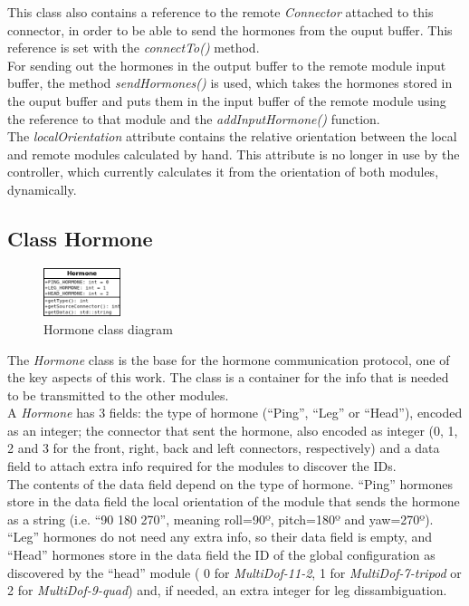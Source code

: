 This class also contains a reference to the remote \emph{Connector} attached to this connector, in order to be able to send the hormones from the ouput buffer. This reference is set with the \emph{connectTo()} method.\\

For sending out the hormones in the output buffer to the remote module input buffer, the method \emph{sendHormones()} is used, which takes the hormones stored in the ouput buffer and puts them in the input buffer of the remote module using the reference to that module and the \emph{addInputHormone()} function.\\

The \emph{localOrientation} attribute contains the relative orientation between the local and remote modules calculated by hand. This attribute is no longer in use by the controller, which currently calculates it from the orientation of both modules, dynamically.\\


\subsection{Class Hormone}
\label{software_class_hormone}

\begin{figure}[h]
		\centering
        \includegraphics[width=0.2\textwidth]{images/Class_diagram_Hormone_members.png}
        \caption{Hormone class diagram}\label{fig:software_class_hormone_class}
\end{figure}

The \emph{Hormone} class is the base for the hormone communication protocol, one of the key aspects of this work. The class is a container for the info that is needed to be transmitted to the other modules.\\

A \emph{Hormone} has 3 fields: the type of hormone (``Ping'', ``Leg'' or  ``Head''), encoded as an integer; the connector that sent the hormone, also encoded as integer (0, 1, 2 and 3 for the front, right, back and left connectors, respectively) and a data field to attach extra info required for the modules to discover the IDs.\\

The contents of the data field depend on the type of hormone. ``Ping'' hormones store in the data field the local orientation of the module that sends the hormone as a string (i.e. ``90 180 270'', meaning roll=90º, pitch=180º and yaw=270º). ``Leg'' hormones do not need any extra info, so their data field is empty, and ``Head'' hormones store in the data field the ID of the global configuration as discovered by the ``head'' module ( 0 for \emph{MultiDof-11-2}, 1 for \emph{MultiDof-7-tripod} or 2 for  \emph{MultiDof-9-quad}) and, if needed, an extra integer for leg dissambiguation.\\


